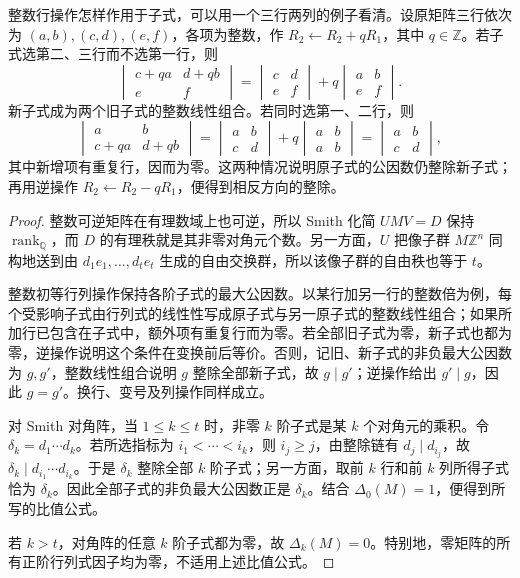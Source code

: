 整数行操作怎样作用于子式，可以用一个三行两列的例子看清。设原矩阵三行依次为 \((a,b),(c,d),(e,f)\)，各项为整数，作 \(R_2\gets R_2+qR_1\)，其中 \(q\in\mathbb Z\)。若子式选第二、三行而不选第一行，则
\[
	\begin{vmatrix}c+qa&d+qb\\e&f\end{vmatrix}
	=\begin{vmatrix}c&d\\e&f\end{vmatrix}
	+q\begin{vmatrix}a&b\\e&f\end{vmatrix}.
\]
新子式成为两个旧子式的整数线性组合。若同时选第一、二行，则
\[
	\begin{vmatrix}a&b\\c+qa&d+qb\end{vmatrix}
	=\begin{vmatrix}a&b\\c&d\end{vmatrix}
	+q\begin{vmatrix}a&b\\a&b\end{vmatrix}
	=\begin{vmatrix}a&b\\c&d\end{vmatrix},
\]
其中新增项有重复行，因而为零。这两种情况说明原子式的公因数仍整除新子式；再用逆操作 \(R_2\gets R_2-qR_1\)，便得到相反方向的整除。

\begin{proof}
	整数可逆矩阵在有理数域上也可逆，所以 Smith 化简 \(UMV=D\) 保持 \(\operatorname{rank}_{\mathbb Q}\)，而 \(D\) 的有理秩就是其非零对角元个数。另一方面，\(U\) 把像子群 \(M\mathbb Z^n\) 同构地送到由 \(d_1e_1,\ldots,d_te_t\) 生成的自由交换群，所以该像子群的自由秩也等于 \(t\)。

	整数初等行列操作保持各阶子式的最大公因数。以某行加另一行的整数倍为例，每个受影响子式由行列式的线性性写成原子式与另一原子式的整数线性组合；如果所加行已包含在子式中，额外项有重复行而为零。若全部旧子式为零，新子式也都为零，逆操作说明这个条件在变换前后等价。否则，记旧、新子式的非负最大公因数为 \(g,g'\)，整数线性组合说明 \(g\) 整除全部新子式，故 \(g\mid g'\)；逆操作给出 \(g'\mid g\)，因此 \(g=g'\)。换行、变号及列操作同样成立。

	对 Smith 对角阵，当 \(1\le k\le t\) 时，非零 \(k\) 阶子式是某 \(k\) 个对角元的乘积。令 \(\delta_k=d_1\cdots d_k\)。若所选指标为 \(i_1<\cdots<i_k\)，则 \(i_j\ge j\)，由整除链有 \(d_j\mid d_{i_j}\)，故 \(\delta_k\mid d_{i_1}\cdots d_{i_k}\)。于是 \(\delta_k\) 整除全部 \(k\) 阶子式；另一方面，取前 \(k\) 行和前 \(k\) 列所得子式恰为 \(\delta_k\)。因此全部子式的非负最大公因数正是 \(\delta_k\)。结合 \(\Delta_0(M)=1\)，便得到所写的比值公式。

	若 \(k>t\)，对角阵的任意 \(k\) 阶子式都为零，故 \(\Delta_k(M)=0\)。特别地，零矩阵的所有正阶行列式因子均为零，不适用上述比值公式。
\end{proof}

